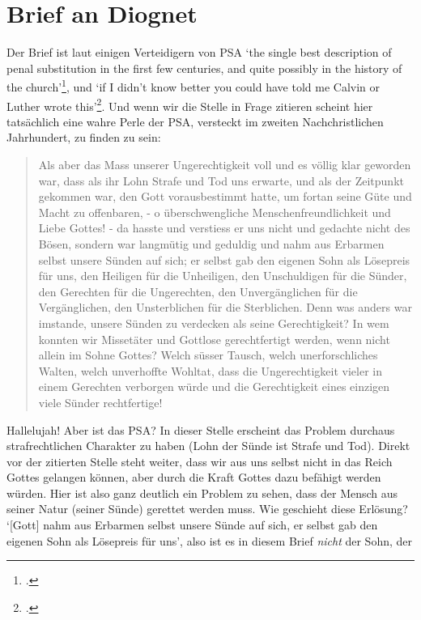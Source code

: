 \section{Brief an Diognet}
Der Brief \Cite{mathetes-epistula-ad-diognetus} ist laut einigen Verteidigern von PSA `the single best description of penal substitution in the first few centuries, and quite possibly in the history of the church'\Footcite{arnold-psa-in-church-history}, und `if I didn’t know better you could have told me Calvin or Luther wrote this'\Footcite{diognetus-on-christs-atonement}.
Und wenn wir die Stelle in Frage zitieren scheint hier tatsächlich eine wahre Perle der PSA, versteckt im zweiten Nachchristlichen Jahrhundert, zu finden zu sein:
\begin{quote}
Als aber das Mass unserer Ungerechtigkeit voll und es völlig klar geworden war, dass als ihr Lohn Strafe und Tod uns erwarte,
und als der Zeitpunkt gekommen war, den Gott vorausbestimmt hatte, um fortan seine Güte und Macht zu offenbaren,
- o überschwengliche Menschenfreundlichkeit und Liebe Gottes! -
da hasste und verstiess er uns nicht und gedachte nicht des Bösen, sondern war langmütig und geduldig und nahm aus Erbarmen selbst unsere Sünden auf sich;
er selbst gab den eigenen Sohn als Lösepreis für uns, den Heiligen für die Unheiligen,
den Unschuldigen für die Sünder, den Gerechten für die Ungerechten, den Unvergänglichen für die Vergänglichen, den Unsterblichen für die Sterblichen.
Denn was anders war imstande, unsere Sünden zu verdecken als seine Gerechtigkeit?
In wem konnten wir Missetäter und Gottlose gerechtfertigt werden, wenn nicht allein im Sohne Gottes?
Welch süsser Tausch, welch unerforschliches Walten, welch unverhoffte Wohltat,
dass die Ungerechtigkeit vieler in einem Gerechten verborgen würde und die Gerechtigkeit eines einzigen viele Sünder rechtfertige!
\end{quote}
Hallelujah! Aber ist das PSA?
In dieser Stelle erscheint das Problem durchaus strafrechtlichen Charakter zu haben (Lohn der Sünde ist Strafe und Tod).
Direkt vor der zitierten Stelle steht weiter, dass wir aus uns selbst nicht in das Reich Gottes gelangen können, aber durch die Kraft Gottes dazu befähigt werden würden.
Hier ist also ganz deutlich ein Problem zu sehen, dass der Mensch aus seiner Natur (seiner Sünde) gerettet werden muss. Wie geschieht diese Erlösung?
`[Gott] nahm aus Erbarmen selbst unsere Sünde auf sich, er selbst gab den eigenen Sohn als Lösepreis für uns', also ist es in diesem Brief \textit{nicht} der Sohn, der 
